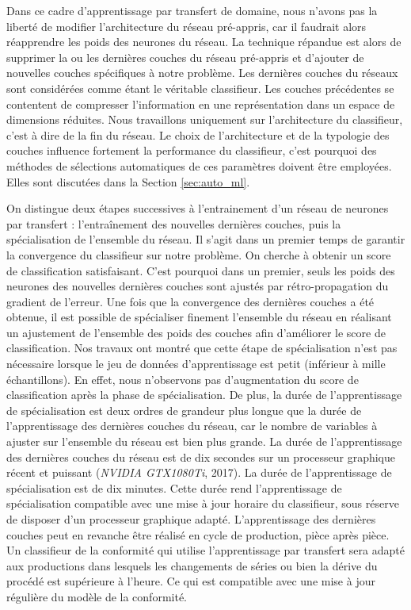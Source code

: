 Dans ce cadre d'apprentissage par transfert de domaine, nous n'avons pas la liberté de modifier l'architecture du réseau pré-appris, car il faudrait alors réapprendre les poids des neurones du réseau.
La technique répandue est alors de supprimer la ou les dernières couches du réseau pré-appris et d'ajouter de nouvelles couches spécifiques à notre problème.
Les dernières couches du réseaux sont considérées comme étant le véritable classifieur.
Les couches précédentes se contentent de compresser l'information en une représentation dans un espace de dimensions réduites.
Nous travaillons uniquement sur l'architecture du classifieur, c'est à dire de la fin du réseau.
Le choix de l'architecture et de la typologie des couches influence fortement la performance du classifieur, c'est pourquoi des méthodes de sélections automatiques de ces paramètres doivent être employées.
Elles sont discutées dans la Section \ref{sec:auto_ml}.

On distingue deux étapes successives à l'entrainement d'un réseau de neurones par transfert : l'entraînement des nouvelles dernières couches, puis la spécialisation de l'ensemble du réseau.
Il s'agit dans un premier temps de garantir la convergence du classifieur sur notre problème.
On cherche à obtenir un score de classification satisfaisant.
C'est pourquoi dans un premier, seuls les poids des neurones des nouvelles dernières couches sont ajustés par rétro-propagation du gradient de l'erreur.
Une fois que la convergence des dernières couches a été obtenue, il est possible de spécialiser finement l'ensemble du réseau en réalisant un ajustement de l'ensemble des poids des couches afin d'améliorer le score de classification.
Nos travaux ont montré que cette étape de spécialisation n'est pas nécessaire lorsque le jeu de données d'apprentissage est petit (inférieur à mille échantillons).
En effet, nous n'observons pas d'augmentation du score de classification après la phase de spécialisation.
De plus, la durée de l'apprentissage de spécialisation est deux ordres de grandeur plus longue que la durée de l'apprentissage des dernières couches du réseau, car le nombre de variables à ajuster sur l'ensemble du réseau est bien plus grande.
La durée de l'apprentissage des dernières couches du réseau est de dix secondes sur un processeur graphique récent et puissant (\textit{NVIDIA GTX1080Ti}, 2017).
La durée de l'apprentissage de spécialisation est de dix minutes.
Cette durée rend l'apprentissage de spécialisation compatible avec une mise à jour horaire du classifieur, sous réserve de disposer d'un processeur graphique adapté. L'apprentissage des dernières couches peut en revanche être réalisé en cycle de production, pièce après pièce.
Un classifieur de la conformité qui utilise l'apprentissage par transfert sera adapté aux productions dans lesquels les changements de séries ou bien la dérive du procédé est supérieure à l'heure. Ce qui est compatible avec une mise à jour régulière du modèle de la conformité.

